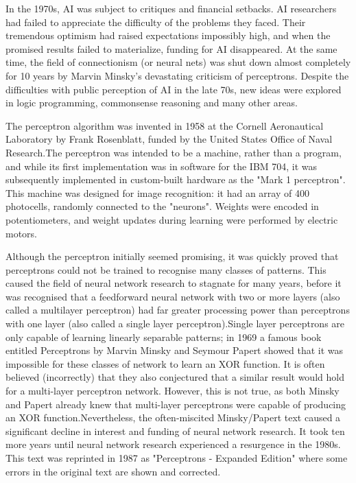 \documentclass[a4paper,12pt]{report}
\begin{document}
In the 1970s, AI was subject to critiques and financial setbacks. AI researchers had failed to appreciate the difficulty of the problems they faced. Their tremendous optimism had raised expectations impossibly high, and when the promised results failed to materialize, funding for AI disappeared. At the same time, the field of connectionism (or neural nets) was shut down almost completely for 10 years by Marvin Minsky's devastating criticism of perceptrons. Despite the difficulties with public perception of AI in the late 70s, new ideas were explored in logic programming, commonsense reasoning and many other areas.

The perceptron algorithm was invented in 1958 at the Cornell Aeronautical Laboratory by Frank Rosenblatt, funded by the United States Office of Naval Research.The perceptron was intended to be a machine, rather than a program, and while its first implementation was in software for the IBM 704, it was subsequently implemented in custom-built hardware as the "Mark 1 perceptron". This machine was designed for image recognition: it had an array of 400 photocells, randomly connected to the "neurons". Weights were encoded in potentiometers, and weight updates during learning were performed by electric motors.

Although the perceptron initially seemed promising, it was quickly proved that perceptrons could not be trained to recognise many classes of patterns. This caused the field of neural network research to stagnate for many years, before it was recognised that a feedforward neural network with two or more layers (also called a multilayer perceptron) had far greater processing power than perceptrons with one layer (also called a single layer perceptron).Single layer perceptrons are only capable of learning linearly separable patterns; in 1969 a famous book entitled Perceptrons by Marvin Minsky and Seymour Papert showed that it was impossible for these classes of network to learn an XOR function. It is often believed (incorrectly) that they also conjectured that a similar result would hold for a multi-layer perceptron network. However, this is not true, as both Minsky and Papert already knew that multi-layer perceptrons were capable of producing an XOR function.Nevertheless, the often-miscited Minsky/Papert text caused a significant decline in interest and funding of neural network research. It took ten more years until neural network research experienced a resurgence in the 1980s. This text was reprinted in 1987 as "Perceptrons - Expanded Edition" where some errors in the original text are shown and corrected.
\end{document}
